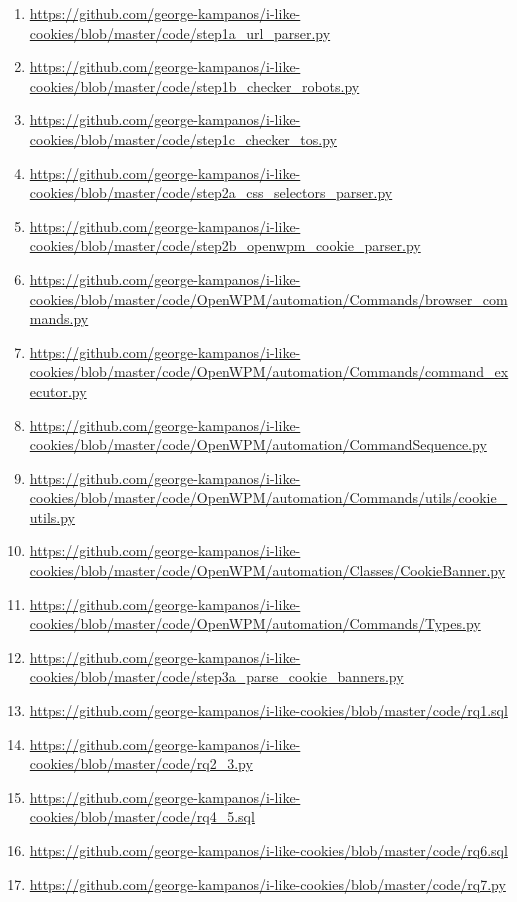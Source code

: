 \documentclass[../main.tex]{subfiles}
\begin{document}
\begin{enumerate}[label=\textbf{A.2.\arabic*}:, ref=A.2.\arabic*, leftmargin=1.65cm]
    \item \label{app:code_design_websites_lists} \url{https://github.com/george-kampanos/i-like-cookies/blob/master/code/step1a_url_parser.py}
    \item \label{app:code_design_robots} \url{https://github.com/george-kampanos/i-like-cookies/blob/master/code/step1b_checker_robots.py}
    \item \label{app:code_design_tos} \url{https://github.com/george-kampanos/i-like-cookies/blob/master/code/step1c_checker_tos.py}
    \item \label{app:code_idcac_parser} \url{https://github.com/george-kampanos/i-like-cookies/blob/master/code/step2a_css_selectors_parser.py}
    \item \label{app:code_openwpm_starter} \url{https://github.com/george-kampanos/i-like-cookies/blob/master/code/step2b_openwpm_cookie_parser.py}
    \item \label{app:code_openwpm_browser_commands} \url{https://github.com/george-kampanos/i-like-cookies/blob/master/code/OpenWPM/automation/Commands/browser_commands.py} 
    \item \label{app:code_openwpm_command_executor} \url{https://github.com/george-kampanos/i-like-cookies/blob/master/code/OpenWPM/automation/Commands/command_executor.py}
    \item \label{app:code_openwpm_command_sequence} \url{https://github.com/george-kampanos/i-like-cookies/blob/master/code/OpenWPM/automation/CommandSequence.py}
    \item \label{app:code_openwpm_cookie_utils} \url{https://github.com/george-kampanos/i-like-cookies/blob/master/code/OpenWPM/automation/Commands/utils/cookie_utils.py}
    \item \label{app:code_openwpm_cookie_banner} \url{https://github.com/george-kampanos/i-like-cookies/blob/master/code/OpenWPM/automation/Classes/CookieBanner.py}
    \item \label{app:code_openwpm_types} \url{https://github.com/george-kampanos/i-like-cookies/blob/master/code/OpenWPM/automation/Commands/Types.py}
    \item \label{app:code_options_parser} \url{https://github.com/george-kampanos/i-like-cookies/blob/master/code/step3a_parse_cookie_banners.py}
    \item \label{app:code_rq1} \url{https://github.com/george-kampanos/i-like-cookies/blob/master/code/rq1.sql}
    \item \label{app:code_rq2_3} \url{https://github.com/george-kampanos/i-like-cookies/blob/master/code/rq2_3.py}
    \item \label{app:code_rq4_5} \url{https://github.com/george-kampanos/i-like-cookies/blob/master/code/rq4_5.sql}
    \item \label{app:code_rq6} \url{https://github.com/george-kampanos/i-like-cookies/blob/master/code/rq6.sql}
    \item \label{app:code_rq7} \url{https://github.com/george-kampanos/i-like-cookies/blob/master/code/rq7.py}
\end{enumerate}
\end{document}
